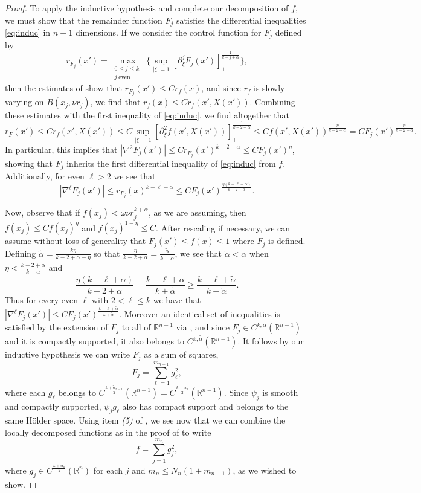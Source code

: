 \documentclass[oneside,hidelinks,indentfirst,10pt]{book}
\begin{document}
\begin{proof}
To apply the inductive hypothesis and complete our decomposition of \(f\), we must show that the remainder function \(F_j\) satisfies the differential inequalities \eqref{eq:induc} in \(n-1\) dimensions. If we consider the control function for \(F_j\) defined by
\[
    r_{F_j}(x')=\max_{\substack{0\leq j\leq k,\\j\;\mathrm{even}}}\bigg\{\sup_{|\xi|=1}[\partial^j_\xi F_j(x')]_+^\frac{1}{k-j+\alpha}\bigg\},
\]
then the estimates of  show that \(r_{F_j}(x')\leq Cr_f(x)\), and since \(r_f\) is slowly varying on \(B(x_j,\nu r_j)\), we find that \(r_f(x)\leq Cr_f(x',X(x'))\). Combining these estimates with the first inequality of \eqref{eq:induc}, we find altogether that
\[
    r_F(x')\leq Cr_f(x',X(x'))\leq C\sup_{|\xi|=1}[\partial^2_\xi f(x',X(x'))]_+^\frac{1}{k-2+\alpha}\leq Cf(x',X(x'))^\frac{\eta}{k-2+\alpha}=CF_j(x')^\frac{\eta}{k-2+\alpha}.
\]
In particular, this implies that \(|\nabla^2 F_j(x')|\leq C r_{F_j}(x')^{k-2+\alpha}\leq CF_j(x')^\eta\), showing that \(F_j\) inherits the first differential inequality of \eqref{eq:induc} from \(f\). Additionally, for even \(\ell>2\) we see that
\[
    |\nabla ^\ell F_j(x')|\leq r_{F_j}(x)^{k-\ell+\alpha}\leq CF_j(x')^\frac{\eta(k-\ell+\alpha)}{k-2+\alpha}.
\]


Now, observe that if \(f(x_j)< \omega\nu r_j^{k+\alpha}\), as we are assuming, then \(f(x_j)\leq Cf(x_j)^\eta\) and \(f(x_j)^{1-\eta}\leq C\). After rescaling if necessary, we can assume without loss of generality that \(F_j(x')\leq f(x)\leq 1\) where \(F_j\) is defined. Defining \(\tilde{\alpha}=\frac{k\eta}{k-2+\alpha-\eta}\) so that \(\frac{\eta}{k-2+\alpha}=\frac{\tilde{\alpha}}{k+\tilde{\alpha}}\), we see that \(\tilde{\alpha}<\alpha\) when \(\eta<\frac{k-2+\alpha}{k+\alpha}\) and
\[
    \frac{\eta(k-\ell+\alpha)}{k-2+\alpha}=\frac{k-\ell+\alpha}{k+\tilde{\alpha}}\geq \frac{k-\ell+\tilde{{\alpha}} }{k+\tilde{\alpha}}.
\]
Thus for every even \(\ell \) with \(2<\ell\leq k\) we have that \(|\nabla ^\ell F_j(x')|\leq CF_j(x')^\frac{k-\ell+\tilde{\alpha} }{k+\tilde{\alpha}}\). Moreover an identical set of inequalities is satisfied by the extension of \(F_j\) to all of \(\mathbb{R}^{n-1}\) via , and since \(F_j\in C^{k,\alpha}(\mathbb{R}^{n-1})\) and it is compactly supported, it also belongs to \(C^{k,\tilde{\alpha}}(\mathbb{R}^{n-1})\). It follows by our inductive hypothesis we can write \(F_j\) as a sum of squares,
\[
    F_j=\sum_{\ell=1}^{m_{n-1}} g_\ell^2,
\]
where each \(g_\ell\) belongs to \(C^{\frac{k+\tilde{\alpha}_{n-1}}{2}}(\mathbb{R}^{n-1})=C^{\frac{k+\alpha_n}{2}}(\mathbb{R}^{n-1})\). Since \(\psi_j\) is smooth and compactly supported, \(\psi_jg_\ell\) also has compact support and belongs to the same H\"older space. Using item \textit{(5)} of , we see now that we can combine the locally decomposed functions as in the proof of  to write
\[
    f=\sum_{j=1}^{m_n}g_j^2,
\]
where \(g_j\in C^{\frac{k+\alpha_n}{2}}(\mathbb{R}^n)\) for each \(j\) and \(m_n\leq N_n(1+m_{n-1})\), as we wished to show.
\end{proof}
\end{document}
